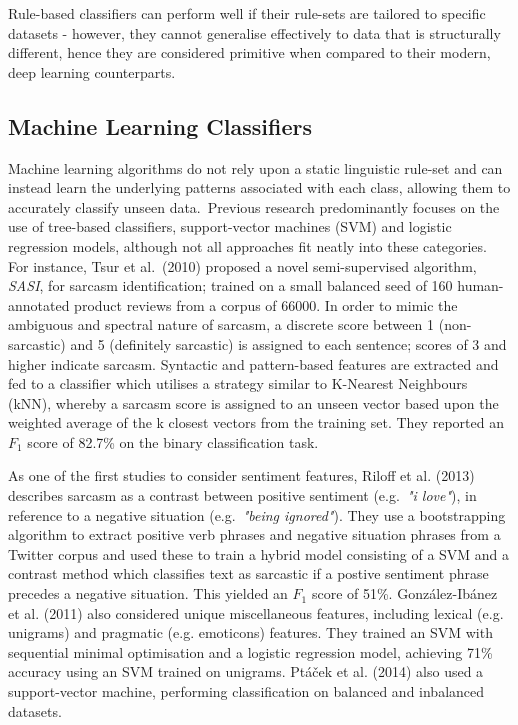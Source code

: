 \documentclass[12pt,a4paper]{article}
\begin{document}
Rule-based classifiers can perform well if their rule-sets are tailored to specific datasets - however, they cannot generalise effectively to data that is structurally different, hence they are considered  primitive when compared to their modern, deep learning counterparts.

\subsection{Machine Learning Classifiers}\vspace{-10pt}
\noindent Machine learning algorithms do not rely upon a static linguistic rule-set and can instead learn the underlying patterns associated with each class, allowing them to accurately classify unseen data.\ Previous research predominantly focuses on the use of tree-based classifiers, support-vector machines (SVM) and logistic regression models, although not all approaches fit neatly into these categories. For instance, Tsur et al.\ (2010) \cite{tsur2010icwsm} proposed a novel semi-supervised algorithm, \textit{SASI}, for sarcasm identification; trained on a small balanced seed of 160 human-annotated product reviews from a corpus of 66000. In order to mimic the ambiguous and spectral nature of sarcasm, a discrete score between 1 (non-sarcastic) and 5 (definitely sarcastic) is assigned to each sentence; scores of 3 and higher indicate sarcasm. Syntactic and pattern-based features are extracted and fed to a classifier which utilises a strategy similar to K-Nearest Neighbours (kNN), whereby a sarcasm score is assigned to an unseen vector based upon the weighted average of the k closest vectors from the training set. They reported an $F_{1}$ score of 82.7\% on the binary classification task.

As one of the first studies to consider sentiment features, Riloff et al. (2013) \cite{riloff2013sarcasm} describes sarcasm as a contrast between positive sentiment (e.g.\ \textit{"i love"}), in reference to a negative situation (e.g.\ \textit{"being ignored"}). They use a bootstrapping algorithm to extract positive verb phrases and negative situation phrases from a Twitter corpus and used these to train a hybrid model consisting of a SVM and a contrast method which classifies text as sarcastic if a postive sentiment phrase precedes a negative situation. This yielded an $F_1$ score of 51\%. Gonz{\'a}lez-Ib{\'a}nez et al. (2011) \cite{gonzalez2011identifying} also considered unique miscellaneous features, including lexical (e.g. unigrams) and pragmatic (e.g. emoticons) features. They trained an SVM with sequential minimal optimisation and a logistic regression model, achieving 71\% accuracy using an SVM trained on unigrams. Pt{\'a}{\v{c}ek et al. (2014)} \cite{ptavcek2014sarcasm} also used a support-vector machine, performing classification on balanced and inbalanced datasets.
\end{document}
